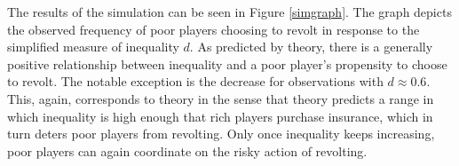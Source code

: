 \documentclass[12pt]{article}
\begin{document}
	The results of the simulation can be seen in Figure \ref{simgraph}. The 
	graph depicts the observed frequency of poor players choosing to revolt in 
	response to the simplified measure of inequality $d$. As predicted by 
	theory, there is a generally positive relationship between inequality and a 
	poor player's propensity to choose to revolt. The notable exception is the 
	decrease for observations with $d\approx0.6$. This, again, corresponds to 
	theory in the sense that theory predicts a range in which inequality is 
	high enough that rich players purchase insurance, which in turn deters poor 
	players from revolting. Only once inequality keeps increasing, poor players 
	can again coordinate on the risky action of revolting.
	
\end{document}
